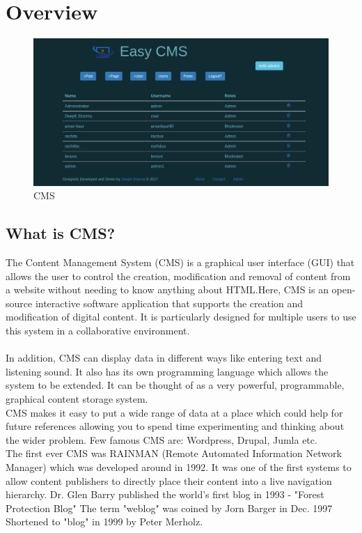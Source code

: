 \section{Overview}
\begin{figure}[!ht]
\centering
\includegraphics[scale=0.41]{input/images/new.png}                   
\caption{CMS}
\hspace{-1.5em}
\end{figure}
\subsection{What is CMS?}
The Content Management System (CMS) is a graphical user interface (GUI) that allows the user to control the creation, modification and removal of content from a website without needing to know anything about HTML.Here, CMS is an open-source interactive software application that supports the creation and modification of digital content. It is particularly designed for multiple users to use this system in a collaborative environment. \\\\
In addition, CMS can display data in different ways like entering text and listening sound. It
also has its own programming language which allows the system to be extended. It can
be thought of as a very powerful, programmable, graphical content storage system.\\
CMS makes it easy to put a wide range of data at a place which could help for future references allowing you to spend time experimenting and thinking about the wider problem.
Few famous CMS are: Wordpress, Drupal, Jumla etc. \\
The first ever CMS was RAINMAN (Remote Automated Information Network Manager) which was developed around in 1992. It was one of the first systems to allow content publishers to directly place their content into a live navigation hierarchy.
Dr. Glen Barry published the world's first blog in 1993 - "Forest Protection Blog" The term "weblog" was coined by Jorn Barger in Dec. 1997 Shortened to "blog" in 1999 by Peter Merholz.
